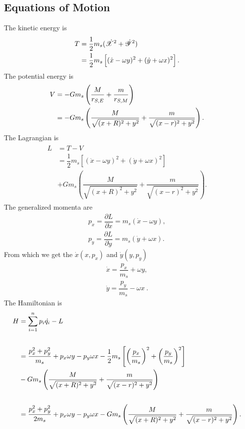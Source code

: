 \subsection{Equations of Motion}
The kinetic energy is
\begin{align}
\label{eq:r3b-T}
\notag T &= \dfrac{1}{2} m_s (\dot{\mathscr{X}}^2 + \dot{\mathscr{Y}}^2) \\
&= \dfrac{1}{2} m_s \left[(\dot{x}-\omega y)^2 + (\dot{y}+\omega x)^2\right].
\end{align}
The potential energy is
\begin{align}
\notag V &= - G m_s \left(\dfrac{M}{r_{S,E}} + \dfrac{m}{r_{S,M}}\right) \\
&= - G m_s \left(\dfrac{M}{\sqrt{(x+R)^2+y^2}} + \dfrac{m}{\sqrt{(x-r)^2+y^2}}\right).
\end{align}
The Lagrangian is
\begin{align}
\begin{split}
L &= T - V \\
&= \dfrac{1}{2} m_s \left[(\dot{x}-\omega y)^2 + (\dot{y}+\omega x)^2\right] \\
&+ G m_s \left(\dfrac{M}{\sqrt{(x+R)^2+y^2}} + \dfrac{m}{\sqrt{(x-r)^2+y^2}}\right).
\end{split}
\end{align}
The generalized momenta are
\begin{align}
p_x = \dfrac{\partial L}{\partial \dot{x}} = m_s(\dot{x} - \omega y), \\
p_y = \dfrac{\partial L}{\partial \dot{y}} = m_s(\dot{y} + \omega x).
\end{align}
From which we get the $\dot{x}(x,p_x)$ and $\dot{y}(y,p_y)$
\begin{align}
\dot{x} = \dfrac{p_x}{m_s} + \omega y, \\
\dot{y} = \dfrac{p_y}{m_s} - \omega x \ .
\end{align}
The Hamiltonian is
\begin{align}
H &= \sum\limits_{i=1}^n p_i \dot{q_i} - L \\[0.6cm]
&= \dfrac{p_x^2 + p_y^2}{m_s} + p_x\omega y - p_y\omega x - \dfrac{1}{2} m_s \left[\left(\dfrac{p_x}{m_s}\right)^2 + \left(\dfrac{p_y}{m_s}\right)^2\right] \\
&- G m_s \left(\dfrac{M}{\sqrt{(x+R)^2+y^2}} + \dfrac{m}{\sqrt{(x-r)^2+y^2}}\right) \notag \\[0.6cm]
&= \dfrac{p_x^2 + p_y^2}{2 m_s} + p_x\omega y - p_y\omega x - G m_s \left(\dfrac{M}{\sqrt{(x+R)^2+y^2}} + \dfrac{m}{\sqrt{(x-r)^2+y^2}}\right).
\end{align}
